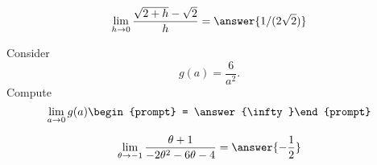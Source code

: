 \documentclass[handout]{ximera}
\begin{document}
\begin{exercise}
	\[\lim_{h \to 0} \frac{\sqrt{2+h} - \sqrt{2}}{h} = \answer{1/(2\sqrt{2})}\]
    
\end{exercise}

\begin{exercise}
Consider 
\[
g(a) = \frac{6}{a^2}.
\]
Compute
\[ \displaystyle\lim_{a \to 0 } g(a) \begin{prompt} = \answer{\infty}\end{prompt} \]

\end{exercise}

\begin{exercise}
\[
\lim_{\theta\to -1 } \frac{\theta +1}{-2 \theta ^2-6 \theta -4} = \answer{-\frac{1}{2}}
\]
\end{exercise}
\end{document}
